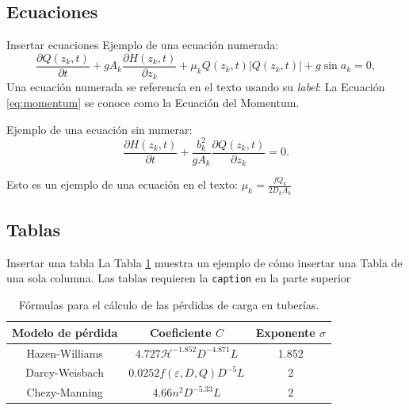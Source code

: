 \documentclass[aspectratio=169]{beamer} %
\begin{document}
\subsection{Ecuaciones}

\begin{frame}{Insertar ecuaciones}
    Ejemplo de una ecuación numerada:
    \begin{equation}
        \frac{\partial Q\left(z_k,t\right)}{\partial t}+gA_k\frac{\partial H\left(z_k,t\right)}{\partial z_k}+\mu_kQ\left(z_k,t\right)\left|Q\left(z_k,t\right)\right|+g\sin{a_k}=0,
        \label{eq:momentum}
    \end{equation}
    Una ecuación numerada se referencía en el texto usando su \textit{label}: La Ecuación \eqref{eq:momentum} se conoce como la Ecuación del Momentum.
    
    Ejemplo de una ecuación sin numerar:
    $$\frac{\partial H\left(z_k,t\right)}{\partial t}+\frac{b_k^2}{gA_k}\frac{\partial Q\left(z_k,t\right)}{\partial z_k}=0.$$

    Esto es un ejemplo de una ecuación en el texto: $\mu_k=\frac{fQ_k}{2D_kA_k}$  
\end{frame}


\subsection{Tablas}

\begin{frame}{Insertar una tabla}
    La Tabla \ref{tab:ModelosPerdida} muestra un ejemplo de cómo insertar una Tabla de una sola columna. Las tablas requieren la \texttt{caption} en la parte superior
    
    \begin{table}[htbp]
        \centering
        \caption{Fórmulas para el cálculo de las pérdidas de carga en tuberías.}
        \label{tab:ModelosPerdida}
        \small
        \begin{tabular}{ccc}
            \toprule
            \textbf{Modelo de pérdida} & \textbf{Coeficiente} $C$ & \textbf{Exponente} $\sigma$ \\
            \midrule
            Hazen-Williams & $4.727 \mathscr{H}^{-1.852}D^{-4.871}L$ & 1.852 \\
            Darcy-Weisbach & $0.0252f(\varepsilon, D, Q)D^{-5}L$ & 2 \\
            Chezy-Manning & $4.66n^2D^{-5.33}L$ & 2 \\
            \bottomrule
        \end{tabular}
    \end{table}
\end{frame}
\end{document}
